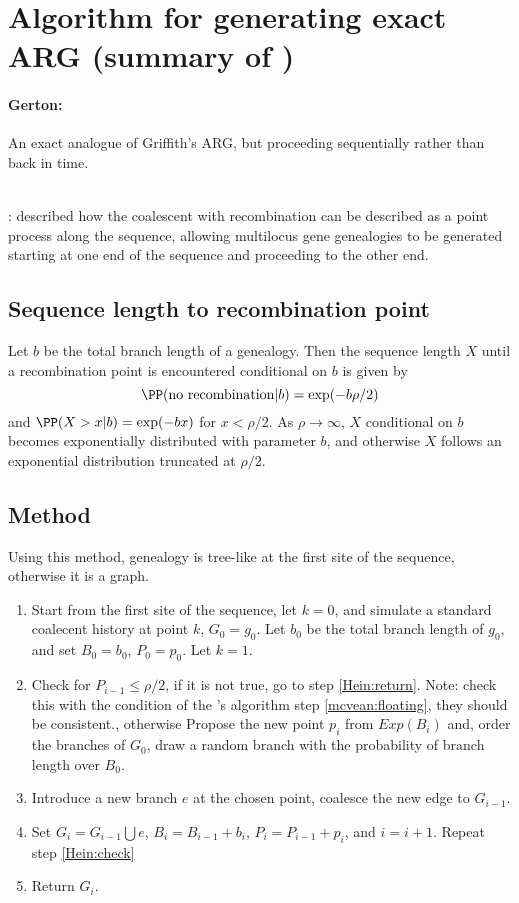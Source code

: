 \section{Algorithm for generating exact ARG (summary of \citet{Wiuf1999})} 
{\color{red}
\paragraph{Gerton:}
An exact analogue of Griffith's ARG, but proceeding sequentially rather than back in time.
}\\
{\color{blue}
\citet{Wakeley2008}:
\citet{Wiuf1999} described how the coalescent with recombination can be described as a point process along the sequence, allowing multilocus gene genealogies to be generated starting at one end of the sequence and proceeding to the other end.
}

{\color{red}
\subsection{Sequence length to recombination point}
Let $b$ be the total branch length of a genealogy. Then the sequence length $X$ until a recombination point is encountered conditional on $b$ is given by $$\PP(\text{no recombination}|b )=\exp(-b\rho/2)$$ and $\PP(X>x|b)=\exp(-bx)$ for $x<\rho/2$. As $\rho\to\infty$, $X$ conditional on $b$ becomes exponentially distributed with parameter $b$, and otherwise $X$ follows an exponential distribution truncated at $\rho/2$. 
}

\subsection{Method}
Using this method, genealogy is tree-like at the first site of the sequence, otherwise it is a graph.
\begin{enumerate}
\item Start from the first site of the sequence, let $k=0$, and simulate a standard coalecent history at point $k$, $G_0=g_0$. Let $b_0$ be the total branch length of $g_0$, and set $B_0=b_0$, $P_0=p_0$. Let $k=1$. 
\item Check for $P_{i-1}\leq \rho/2$, if it is not true, go to step \ref{Hein:return}. {\color{red} Note: check this with the condition of the \citet{McVean2005}'s algorithm step \ref{mcvean:floating}, they should be consistent.}, otherwise Propose the new point $p_i$ from $Exp(B_i)$ and, order the branches of $G_0$, draw a random branch with the probability of branch length over $B_0$. \label{Hein:check}
\item Introduce a new branch $e$ at the chosen point, coalesce the new edge to $G_{i-1}$.
\item Set $G_i=G_{i-1}\bigcup e$, $B_i=B_{i-1}+b_i$, $P_i=P_{i-1}+p_i$, and $i=i+1$. Repeat step \ref{Hein:check}
\item Return $G_i$. \label{Hein:return}
\end{enumerate}




